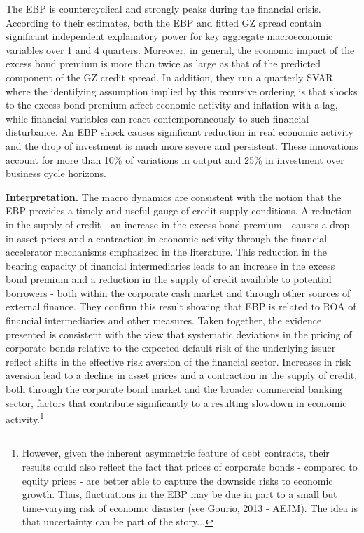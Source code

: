 \documentclass{article}
\begin{document}
{The EBP is countercyclical and strongly peaks during the financial crisis. According to their estimates, both the EBP and fitted GZ spread contain significant independent explanatory power for key aggregate macroeconomic variables over 1 and 4 quarters. Moreover, in general, the economic impact of the excess bond premium is more than twice as large as that of the predicted component of the GZ credit spread. In addition, they run a quarterly SVAR where the identifying assumption implied by this recursive ordering is that shocks to the excess bond premium affect economic activity and inflation with a lag, while financial variables can react contemporaneously to such financial disturbance. An EBP shock causes significant reduction in real economic activity and the drop of investment is much more severe and persistent. These innovations account for more than 10\% of variations in output and 25\% in investment over business cycle horizons.

\textbf{Interpretation.} The macro dynamics are consistent with the notion that the EBP provides a timely and useful gauge of credit supply conditions. A reduction in the supply of credit - an increase in the excess bond premium - causes a drop in asset prices and a contraction in economic activity through the financial accelerator mechanisms emphasized in the literature. This reduction in the bearing capacity of financial intermediaries leads to an increase in the excess bond premium and a reduction in the supply of credit available to potential borrowers - both within the corporate cash market and through other sources of external finance. They confirm this result showing that EBP is related to ROA of financial intermediaries and other measures. Taken together, the evidence presented is consistent with the view that systematic deviations in the pricing of corporate bonds relative to the expected default risk of the underlying issuer reflect shifts in the effective risk aversion of the financial sector. Increases in risk aversion lead to a decline in asset prices and a contraction in the supply of credit, both through the corporate bond market and the broader commercial banking sector, factors that contribute significantly to a resulting slowdown in economic activity.\footnote{However, given the inherent asymmetric feature of debt contracts, their results could also reflect the fact that prices of corporate bonds - compared to equity prices - are better able to capture the downside risks to economic growth. Thus, fluctuations in the EBP may be due in part to a small but time-varying risk of economic disaster (see Gourio, 2013 - AEJM). The idea is that uncertainty can be part of the story...}


}
\end{document}
